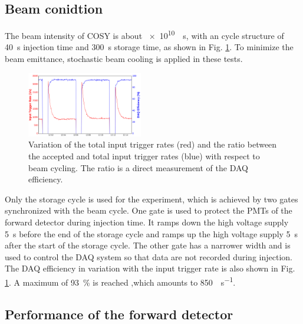 \documentclass[number,5p]{elsarticle}
\begin{document}
\subsection{Beam conidtion}
\label{sec:beam}
The beam intensity of COSY is about \SI[per-mode=reciprocal]{e10}{\per\second}, with an cycle structure of
\SI{40}{\second} injection time and \SI{300}{\second} storage time, as shown in Fig. \ref{fig:beam}.
To minimize the beam emittance, stochastic beam cooling is applied in these tests.
\begin{figure}[h]
  \centering
  \includegraphics[width=0.45\textwidth]{./daq_efficiency.png}
  \caption{Variation of the total input trigger rates (red) and the ratio between the accepted
    and total input trigger rates (blue) with respect to beam cycling. The ratio
    is a direct measurement of the DAQ efficiency.}
  \label{fig:beam}
\end{figure}

Only the storage cycle is used for the experiment, which is achieved by two
gates synchronized with the beam cycle.
One gate is used to protect the PMTs of the forward detector during injection
time.
It ramps down the high voltage supply \SI{5}{\second} before the end of the
storage cycle and ramps up the high voltage supply \SI{5}{\second} after the start of the storage cycle.
The other gate has a narrower width and is used to control the DAQ system so that data are not recorded during injection.
The DAQ efficiency in variation with the input trigger rate is also shown in Fig. \ref{fig:beam}.
A maximum of \SI{93}{\percent} is reached ,which amounts to \SI{850}{\event\per\second}.

\subsection{Performance of the forward detector}
\label{sec:fwd_performance}
\end{document}
